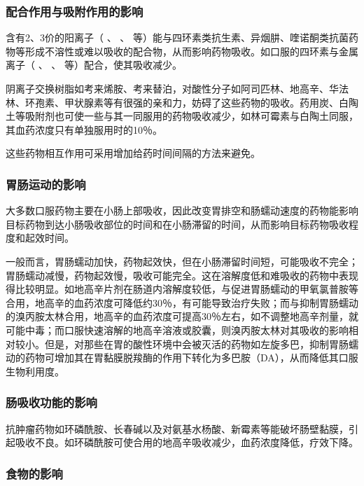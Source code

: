 \subsubsection{配合作用与吸附作用的影响}

含有2、3价的阳离子（ 、 、
等）能与四环素类抗生素、异烟肼、喹诺酮类抗菌药物等形成不溶性或难以吸收的配合物，从而影响药物吸收。如口服的四环素与金属离子（
、 、 等）配合，使其吸收减少。

阴离子交换树脂如考来烯胺、考来替泊，对酸性分子如阿司匹林、地高辛、华法林、环孢素、甲状腺素等有很强的亲和力，妨碍了这些药物的吸收。药用炭、白陶土等吸附剂也可使一些与其一同服用的药物吸收减少，如林可霉素与白陶土同服，其血药浓度只有单独服用时的10％。

这些药物相互作用可采用增加给药时间间隔的方法来避免。

\subsubsection{胃肠运动的影响}

大多数口服药物主要在小肠上部吸收，因此改变胃排空和肠蠕动速度的药物能影响目标药物到达小肠吸收部位的时间和在小肠滞留的时间，从而影响目标药物吸收程度和起效时间。

一般而言，胃肠蠕动加快，药物起效快，但在小肠滞留时间短，可能吸收不完全；胃肠蠕动减慢，药物起效慢，吸收可能完全。这在溶解度低和难吸收的药物中表现得比较明显。如地高辛片剂在肠道内溶解度较低，与促进胃肠蠕动的甲氧氯普胺等合用，地高辛的血药浓度可降低约30％，有可能导致治疗失败；而与抑制胃肠蠕动的溴丙胺太林合用，地高辛的血药浓度可提高30％左右，如不调整地高辛剂量，就可能中毒；而口服快速溶解的地高辛溶液或胶囊，则溴丙胺太林对其吸收的影响相对较小。但是，对那些在胃的酸性环境中会被灭活的药物如左旋多巴，抑制胃肠蠕动的药物可增加其在胃黏膜脱羧酶的作用下转化为多巴胺（DA），从而降低其口服生物利用度。

\subsubsection{肠吸收功能的影响}

抗肿瘤药物如环磷酰胺、长春碱以及对氨基水杨酸、新霉素等能破坏肠壁黏膜，引起吸收不良。如环磷酰胺可使合用的地高辛吸收减少，血药浓度降低，疗效下降。

\subsubsection{食物的影响}

